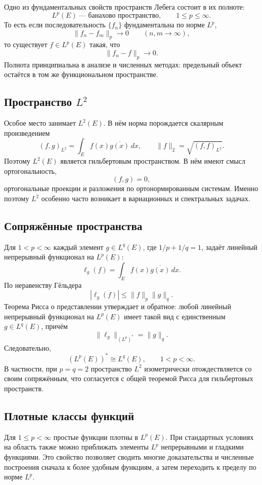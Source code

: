 Одно из фундаментальных свойств пространств Лебега состоит в их полноте:
\[
    L^p(E)\ \text{--- банахово пространство},
    \qquad 1\leq p\leq\infty.
\]
То есть если последовательность $\{f_n\}$ фундаментальна по норме $L^p$,
\[
    \|f_n-f_m\|_p\longrightarrow0
    \qquad (n,m\to\infty),
\]
то существует $f\in L^p(E)$ такая, что
\[
    \|f_n-f\|_p\to0.
\]
Полнота принципиальна в анализе и численных методах: предельный объект остаётся
в том же функциональном пространстве.

\subsection[Пространство L2]{Пространство $L^2$}

Особое место занимает $L^2(E)$. В нём норма порождается скалярным
произведением
\[
    (f,g)_{L^2}=\int_E f(x)\overline{g(x)}\,dx,
    \qquad
    \|f\|_2=\sqrt{(f,f)_{L^2}}.
\]
Поэтому $L^2(E)$ является гильбертовым пространством. В нём имеют смысл
ортогональность,
\[
    (f,g)=0,
\]
ортогональные проекции и разложения по ортонормированным системам. Именно поэтому
$L^2$ особенно часто возникает в вариационных и спектральных задачах.

\subsection{Сопряжённые пространства}

Для $1<p<\infty$ каждый элемент $g\in L^q(E)$, где
$1/p+1/q=1$, задаёт линейный непрерывный функционал на $L^p(E)$:
\[
    \ell_g(f)=\int_E f(x)\overline{g(x)}\,dx.
\]
По неравенству Гёльдера
\[
    |\ell_g(f)|\leq\|f\|_p\|g\|_q.
\]
Теорема Рисса о представлении утверждает и обратное: любой линейный
непрерывный функционал на $L^p(E)$ имеет такой вид с единственным
$g\in L^q(E)$, причём
\[
    \|\ell_g\|_{(L^p)^*}=\|g\|_q.
\]
Следовательно,
\[
    (L^p(E))^*\cong L^q(E),
    \qquad 1<p<\infty.
\]
В частности, при $p=q=2$ пространство $L^2$ изометрически отождествляется со
своим сопряжённым, что согласуется с общей теоремой Рисса для гильбертовых
пространств.

\subsection{Плотные классы функций}

Для $1\leq p<\infty$ простые функции плотны в $L^p(E)$. При стандартных
условиях на область также можно приближать элементы $L^p$ непрерывными и
гладкими функциями. Это свойство позволяет сводить многие доказательства и
численные построения сначала к более удобным функциям, а затем переходить к
пределу по норме $L^p$.

